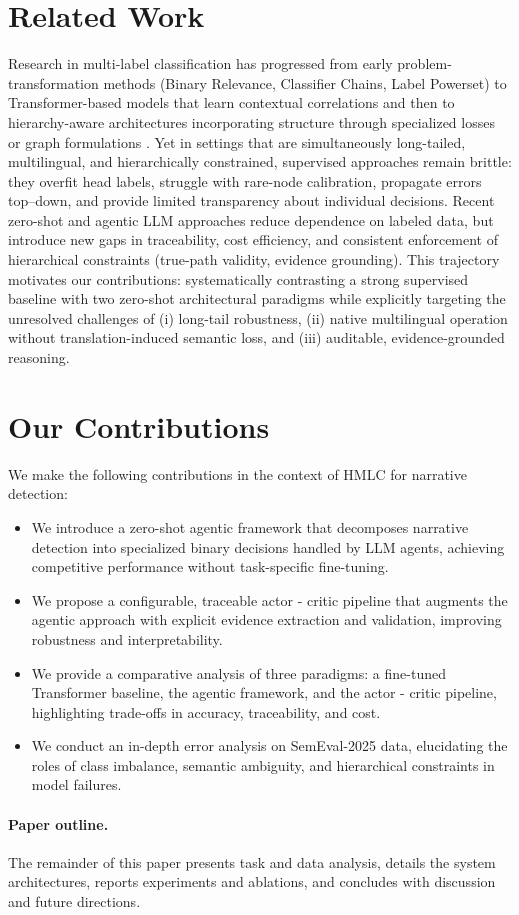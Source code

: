 \section{Related Work}
Research in multi-label classification has progressed from early problem-transformation methods (Binary Relevance, Classifier Chains, Label Powerset) \cite{zhang_binary_2018, weng_label_2020, shan_co-learning_2018} to Transformer-based models that learn contextual correlations \cite{devlin_bert_2019} and then to hierarchy-aware architectures incorporating structure through specialized losses or graph formulations \cite{sadat_hierarchical_2022, peng_hierarchical_2021, gong_hierarchical_2020, liu2023recentadvanceshierarchicalmultilabel}. Yet in settings that are simultaneously long-tailed, multilingual, and hierarchically constrained, supervised approaches remain brittle: they overfit head labels, struggle with rare-node calibration, propagate errors top–down, and provide limited transparency about individual decisions. Recent zero-shot and agentic LLM approaches \cite{GateNLP_github2025, Singh2025} reduce dependence on labeled data, but introduce new gaps in traceability, cost efficiency, and consistent enforcement of hierarchical constraints (true-path validity, evidence grounding). This trajectory motivates our contributions: systematically contrasting a strong supervised baseline with two zero-shot architectural paradigms while explicitly targeting the unresolved challenges of (i) long-tail robustness, (ii) native multilingual operation without translation-induced semantic loss, and (iii) auditable, evidence-grounded reasoning.

\section{Our Contributions}
We make the following contributions in the context of HMLC for narrative detection:
\begin{itemize}
  \item We introduce a zero-shot agentic framework that decomposes narrative detection into specialized binary decisions handled by LLM agents, achieving competitive performance without task-specific fine-tuning.
  \item We propose a configurable, traceable actor - critic pipeline that augments the agentic approach with explicit evidence extraction and validation, improving robustness and interpretability.
  \item We provide a comparative analysis of three paradigms: a fine-tuned Transformer baseline, the agentic framework, and the actor - critic pipeline, highlighting trade-offs in accuracy, traceability, and cost.
  \item We conduct an in-depth error analysis on SemEval-2025 data, elucidating the roles of class imbalance, semantic ambiguity, and hierarchical constraints in model failures.
\end{itemize}

\paragraph{Paper outline.} The remainder of this paper presents task and data analysis, details the system architectures, reports experiments and ablations, and concludes with discussion and future directions.
